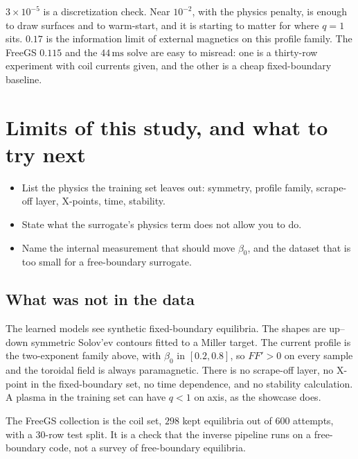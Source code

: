 \documentclass[11pt,a4paper,oneside,openany]{book}
\newcommand{\code}{\path}
\numberwithin{equation}{chapter}
\theoremstyle{definition}
\begin{document}
\begin{keyideas}
\(3\times 10^{-5}\) is a discretization check. Near \(10^{-2}\), with the physics penalty, is enough to draw surfaces and to warm-start, and it is starting to matter for where \(q=1\) sits. \(0.17\) is the information limit of external magnetics on this profile family. The FreeGS \(0.115\) and the \(44\,\mathrm{ms}\) solve are easy to misread: one is a thirty-row experiment with coil currents given, and the other is a cheap fixed-boundary baseline.
\end{keyideas}

\chapter{Limits of this study, and what to try next}
\label{ch:limits}

\begin{objectives}
\begin{itemize}[leftmargin=1.2em]
\item List the physics the training set leaves out: symmetry, profile family, scrape-off layer, X-points, time, stability.
\item State what the surrogate's physics term does not allow you to do.
\item Name the internal measurement that should move \(\beta_{0}\), and the dataset that is too small for a free-boundary surrogate.
\end{itemize}
\end{objectives}

\section{What was not in the data}

The learned models see synthetic fixed-boundary equilibria. The shapes are up--down symmetric Solov'ev contours fitted to a Miller target. The current profile is the two-exponent family above, with \(\beta_{0}\) in \([0.2,0.8]\), so \(FF'>0\) on every sample and the toroidal field is always paramagnetic. There is no scrape-off layer, no X-point in the fixed-boundary set, no time dependence, and no stability calculation. A plasma in the training set can have \(q<1\) on axis, as the showcase does.

The FreeGS collection is the \code{TestTokamak} coil set, \(298\) kept equilibria out of \(600\) attempts, with a \(30\)-row test split. It is a check that the inverse pipeline runs on a free-boundary code, not a survey of free-boundary equilibria.
\end{document}
